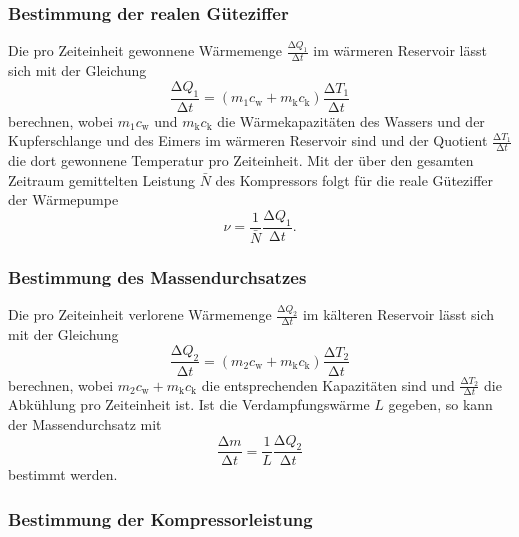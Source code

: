 \subsubsection{Bestimmung der realen Güteziffer}

Die pro Zeiteinheit gewonnene Wärmemenge $\frac{\increment Q_1}{\increment t}$ im
wärmeren Reservoir lässt
sich mit der Gleichung
\begin{equation}
  \frac{\increment Q_1}{\increment t} = (m_1 c_\text{w} + m_\text{k}c_\text{k})
  \frac{\increment T_1}{\increment t}
\end{equation}
berechnen, wobei $m_1 c_\text{w}$ und $m_\text{k}c_\text{k}$ die
Wärmekapazitäten des Wassers und der Kupferschlange und des Eimers im wärmeren
Reservoir sind und der Quotient $\frac{\increment T_1}{\increment t}$ die
dort gewonnene Temperatur pro Zeiteinheit.
Mit der über den gesamten Zeitraum gemittelten Leistung $\bar{N}$ des
Kompressors folgt für die reale Güteziffer der Wärmepumpe
\begin{equation}
  \nu = \frac{1}{\bar{N}}\frac{\increment Q_1}{\increment t}.
\end{equation}

\subsubsection{Bestimmung des Massendurchsatzes}

Die pro Zeiteinheit verlorene Wärmemenge $\frac{\increment Q_2}{\increment t}$ im
kälteren Reservoir lässt sich mit der Gleichung
\begin{equation}
  \frac{\increment Q_2}{\increment t} = (m_2 c_\text{w} + m_\text{k}c_\text{k})
  \frac{\increment T_2}{\increment t}
\end{equation}
berechnen, wobei $m_2 c_\text{w} + m_\text{k}c_\text{k}$ die entsprechenden
Kapazitäten sind und $\frac{\increment T_2}{\increment t}$ die Abkühlung pro Zeiteinheit
ist.
Ist die Verdampfungswärme $L$ gegeben, so kann der Massendurchsatz mit
\begin{equation}
  \frac{\increment m}{\increment t} = \frac{1}{L}\frac{\increment Q_2}{\increment t}
\end{equation}
bestimmt werden.

\subsubsection{Bestimmung der Kompressorleistung}

